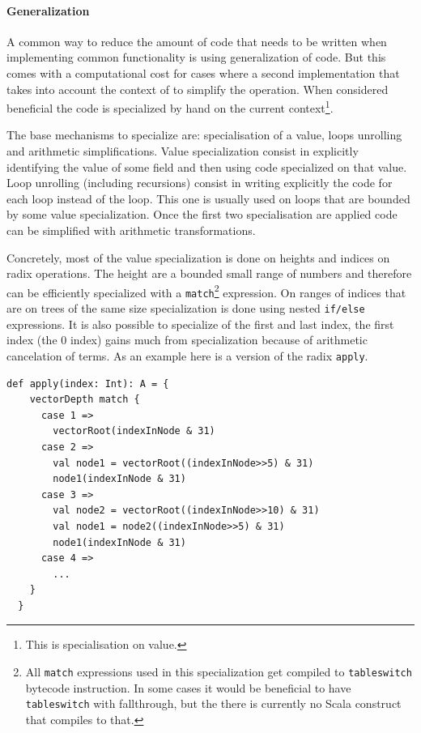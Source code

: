 
\paragraph{Generalization}
A common way to reduce the amount of code that needs to be written when implementing common functionality is using generalization of code. But this comes with a computational cost for cases where a second implementation that takes into account the context of to simplify the operation. When considered beneficial the code is specialized by hand on the current context\footnote{This is specialisation on value.}. 

The base mechanisms to specialize are: specialisation of a value, loops unrolling and arithmetic simplifications. Value specialization consist in explicitly identifying the value of some field and then using code specialized on that value. Loop unrolling (including recursions) consist in writing explicitly the code for each loop instead of the loop. This one is usually used on loops that are bounded by some value specialization. Once the first two specialisation are applied code can be simplified with arithmetic transformations. 

Concretely, most of the value specialization is done on heights and indices on radix operations. The height are a bounded small range of numbers and therefore can be efficiently specialized with a \texttt{match}\footnote{All \texttt{match} expressions used in this specialization get compiled to \texttt{tableswitch} bytecode instruction. In some cases it would be beneficial to have  \texttt{tableswitch} with fallthrough, but the there is currently no Scala construct that compiles to that.} expression. On ranges of indices that are on trees of the same size specialization is done using nested \texttt{if/else} expressions. It is also possible to specialize of the first and last index, the first index (the 0 index) gains much from specialization because of arithmetic cancelation of terms. As an example here is a version of the radix \texttt{apply}. 

\begin{lstlisting}[frame=single]
def apply(index: Int): A = {
    vectorDepth match {
      case 1 => 
        vectorRoot(indexInNode & 31)
      case 2 => 
        val node1 = vectorRoot((indexInNode>>5) & 31)
        node1(indexInNode & 31)
      case 3 => 
        val node2 = vectorRoot((indexInNode>>10) & 31)
        val node1 = node2((indexInNode>>5) & 31)
        node1(indexInNode & 31)
      case 4 =>
        ...
    }
  }
\end{lstlisting}

